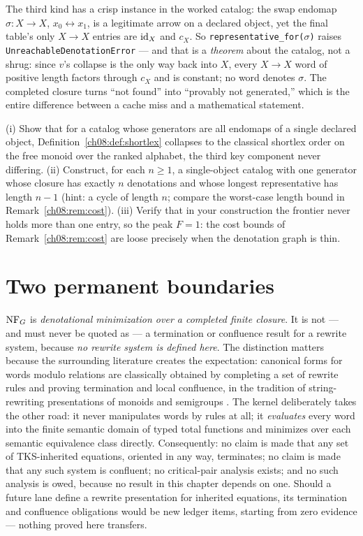 The third kind has a crisp instance in the worked catalog: the swap
endomap $\sigma:X\to X$, $x_0\leftrightarrow x_1$, is a legitimate arrow on
a declared object, yet the final table's only $X\to X$ entries are $\mathrm{id}_X$
and $c_X$. So \texttt{representative\_for($\sigma$)} raises
\texttt{UnreachableDenotationError} --- and that is a \emph{theorem} about
the catalog, not a shrug: since $v$'s collapse is the only way back into
$X$, every $X\to X$ word of positive length factors through $c_X$ and is
constant; no word denotes $\sigma$. The completed closure turns
``not found'' into ``provably not generated,'' which is the entire
difference between a cache miss and a mathematical statement.

\begin{exercise}\label{ch08:exercise:chain}
(i) Show that for a catalog whose generators are all endomaps of a single
declared object, Definition~\ref{ch08:def:shortlex} collapses to the
classical shortlex order on the free monoid over the ranked alphabet, the
third key component never differing. (ii) Construct, for each $n\ge 1$, a
single-object catalog with one generator whose closure has exactly $n$
denotations and whose longest representative has length $n-1$ (hint: a
cycle of length $n$; compare the worst-case length bound in
Remark~\ref{ch08:rem:cost}). (iii) Verify that in your construction the
frontier never holds more than one entry, so the peak $F=1$: the cost
bounds of Remark~\ref{ch08:rem:cost} are loose precisely when the
denotation graph is thin.
\end{exercise}

\section{Two permanent boundaries}\label{ch08:sec:boundaries}

\begin{boundary}\label{ch08:bd:norewrite}
$\mathrm{NF}_G$ is \emph{denotational minimization over a completed finite
closure}. It is not --- and must never be quoted as --- a termination or
confluence result for a rewrite system, because \emph{no rewrite system is
defined here}. The distinction matters because the surrounding literature
creates the expectation: canonical forms for words modulo relations are
classically obtained by completing a set of rewrite rules and proving
termination and local confluence, in the tradition of string-rewriting
presentations of monoids and semigroups \cite{howie,pin}. The kernel
deliberately takes the other road: it never manipulates words by rules at
all; it \emph{evaluates} every word into the finite semantic domain of
typed total functions and minimizes over each semantic equivalence class
directly. Consequently: no claim is made that any set of TKS-inherited
equations, oriented in any way, terminates; no claim is made that any such
system is confluent; no critical-pair analysis exists; and no such analysis
is owed, because no result in this chapter depends on one. Should a future
lane define a rewrite presentation for inherited equations, its
termination and confluence obligations would be new ledger items, starting
from zero evidence --- nothing proved here transfers.
\end{boundary}

